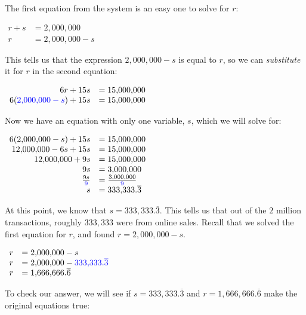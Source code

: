 \documentclass[nooutcomes]{ximera}
\begin{document}
\begin{example}
\begin{explanation}
        The first equation from the system is an easy one to solve for $r$:
\begin{center}
$
\begin{array}{rl}
          r+s &=2{,}000{,}000\\
          r &=2{,}000{,}000-s
\end{array}
$
\end{center}
        This tells us that the expression
        $2{,}000{,}000-s$ is equal to $r$,
        so we can \textit{substitute} it for $r$ in the second equation:
\begin{center}
        $
\begin{array}{rl}
          6r+15s &=15{,}000{,}000\\
          6({\color{blue}{{2{,}000{,}000-s}}})+15s &=15{,}000{,}000
\end{array}
$
\end{center}
          Now we have an equation with only one variable, $s$, which we will solve for:
\begin{center}
$
\begin{array}{rl}
          6(2{,}000{,}000-s)+15s &=15{,}000{,}000\\
          12{,}000{,}000-6s+15s &=15{,}000{,}000\\
          12{,}000{,}000+9s &= 15{,}000{,}000\\
              9s &= 3{,}000{,}000\\
          \frac{9s}{{\color{blue}{{9}}}} &= \frac{3{,}000{,}000}{{\color{blue}{{9}}}}\\
          s &= 333{,}333.\overline{3}
\end{array}
$
\end{center}
        At this point, we know that $s=333{,}333.\overline{3}$.
        This tells us that out of the $2$ million transactions,
        roughly $333{,}333$ were from online sales.
        Recall that we solved the first equation for $r$,
        and found $r=2{,}000{,}000-s$.
\begin{center}
$
\begin{array}{rl}
          r &=2{,}000{,}000-s \\
          r &=2{,}000{,}000-{\color{blue}{{333{,}333.\overline{3}}}}\\
          r &=1{,}666{,}666.\overline{6}
\end{array}
$
\end{center}
        To check our answer, we will see if $s=333{,}333.\overline{3}$ and
        $r=1{,}666{,}666.\overline{6}$ make the original equations true:
\begin{center}

\end{center}
\end{explanation}
\end{example}
\end{document}
